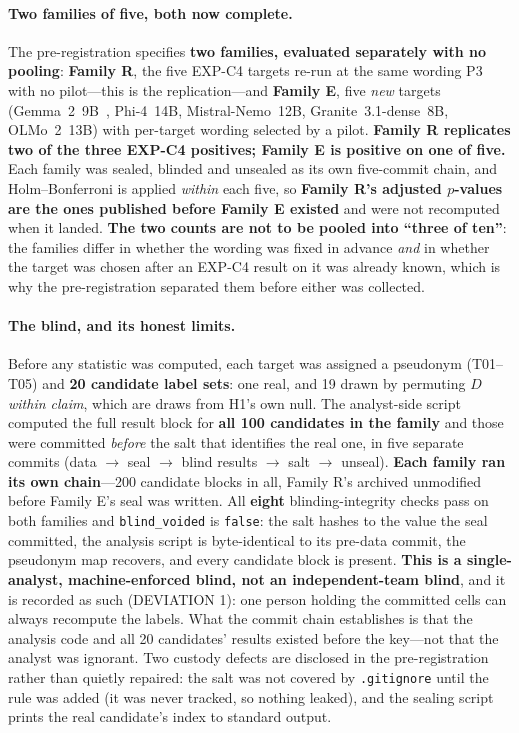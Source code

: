 \paragraph{Two families of five, both now complete.} The pre-registration specifies \textbf{two families, evaluated separately with no pooling}: \textbf{Family R}, the five EXP-C4 targets re-run at the same wording P3 with no pilot---this is the replication---and \textbf{Family E}, five \emph{new} targets (Gemma~2~9B~\citep{team2024gemma2}, Phi-4~14B, Mistral-Nemo~12B, Granite~3.1-dense~8B, OLMo~2~13B) with per-target wording selected by a pilot. \textbf{Family R replicates two of the three EXP-C4 positives; Family E is positive on one of five.} Each family was sealed, blinded and unsealed as its own five-commit chain, and Holm--Bonferroni is applied \emph{within} each five, so \textbf{Family R's adjusted $p$-values are the ones published before Family E existed} and were not recomputed when it landed. \textbf{The two counts are not to be pooled into ``three of ten''}: the families differ in whether the wording was fixed in advance \emph{and} in whether the target was chosen after an EXP-C4 result on it was already known, which is why the pre-registration separated them before either was collected.

\paragraph{The blind, and its honest limits.} Before any statistic was computed, each target was assigned a pseudonym (T01--T05) and \textbf{20 candidate label sets}: one real, and 19 drawn by permuting $D$ \emph{within claim}, which are draws from H1's own null. The analyst-side script computed the full result block for \textbf{all 100 candidates in the family} and those were committed \emph{before} the salt that identifies the real one, in five separate commits (data $\to$ seal $\to$ blind results $\to$ salt $\to$ unseal). \textbf{Each family ran its own chain}---200 candidate blocks in all, Family R's archived unmodified before Family E's seal was written. All \textbf{eight} blinding-integrity checks pass on both families and \texttt{blind\_voided} is \texttt{false}: the salt hashes to the value the seal committed, the analysis script is byte-identical to its pre-data commit, the pseudonym map recovers, and every candidate block is present. \textbf{This is a single-analyst, machine-enforced blind, not an independent-team blind}, and it is recorded as such (DEVIATION 1): one person holding the committed cells can always recompute the labels. What the commit chain establishes is that the analysis code and all 20 candidates' results existed before the key---not that the analyst was ignorant. Two custody defects are disclosed in the pre-registration rather than quietly repaired: the salt was not covered by \texttt{.gitignore} until the rule was added (it was never tracked, so nothing leaked), and the sealing script prints the real candidate's index to standard output.

